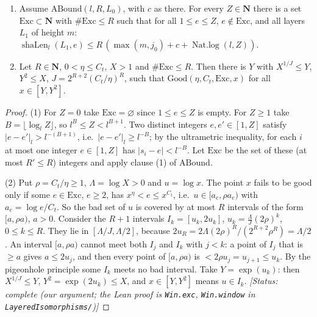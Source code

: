 \begin{lemma}\label{lem:S-window}
\begin{enumerate}
\item Assume $\mathrm{ABound}(l,R,L_0)$, with $c$ as there. For every $Z\in\mathbf{N}$ there is a set $\mathrm{Exc}\subset\mathbf{N}$
with $\#\mathrm{Exc}\le R$ such that for all $1\le e\le Z$, $e\notin\mathrm{Exc}$, and all layers $L_1$ of height $m$:
$\operatorname{shaLen}_l(L_1,e)\le R\,(\max(m,j_0)+c+\operatorname{Nat.log}(l,Z))$.
\item Let $R\in\mathbf{N}$, $0<\eta\le C_t$, $X>1$ and $\#\mathrm{Exc}\le R$. Then there is $Y$ with
$X^{1/J}\le Y$, $Y^2\le X$, $J=2^{R+2}(C_t/\eta)^R$, such that $\mathrm{Good}(\eta,C_t,\mathrm{Exc},x)$ for all
$x\in[Y,Y^2]$.
\end{enumerate}
\end{lemma}
\begin{proof}
(1) For $Z=0$ take $\mathrm{Exc}=\varnothing$ since $1\le e\le Z$ is empty. For $Z\ge1$ take $B=\lfloor\log_l Z\rfloor$, so $l^{B}\le Z<l^{B+1}$. Two distinct integers $e,e'\in[1,Z]$ satisfy
$|e-e'|_l> l^{-(B+1)}$, i.e.\ $|e-e'|_l\ge l^{-B}$; by the ultrametric inequality, for each $i$ at most
one integer $e\in[1,Z]$ has $|s_i-e|<l^{-B}$. Let $\mathrm{Exc}$ be the set of these (at most $R'\le R$)
integers and apply clause (1) of $\mathrm{ABound}$.

(2) Put $\rho=C_t/\eta\ge1$, $\Lambda=\log X>0$ and $u=\log x$. The point $x$ fails to be good only if
some $e\in\mathrm{Exc}$, $e\ge2$, has $x^{\eta}<e\le x^{C_t}$, i.e.\ $u\in[a_e,\rho a_e)$ with $a_e=\log e/C_t$. So the
bad set of $u$ is covered by at most $R$ intervals of the form $[a,\rho a)$, $a>0$. Consider the $R+1$
intervals $I_k=[u_k,2u_k]$, $u_k=\tfrac{\Lambda}{J}(2\rho)^k$, $0\le k\le R$. They lie in $[\Lambda/J,\Lambda/2]$, because
$2u_R=2\Lambda(2\rho)^R/(2^{R+2}\rho^R)=\Lambda/2$. An interval $[a,\rho a)$ cannot meet both $I_j$ and $I_k$ with
$j<k$: a point of $I_j$ that is $\ge a$ gives $a\le2u_j$, and then every point of $[a,\rho a)$ is
$<2\rho u_j=u_{j+1}\le u_k$. By the pigeonhole principle some $I_k$ meets no bad interval. Take $Y=\exp(u_k)$:
then $X^{1/J}\le Y$, $Y^2=\exp(2u_k)\le X$, and $x\in[Y,Y^2]$ means $u\in I_k$.
\textit{[Status: complete (our argument; the Lean proof is \texttt{Win.exc}, \texttt{Win.window} in
\texttt{LayeredIsomorphisms/})]}
\end{proof}

